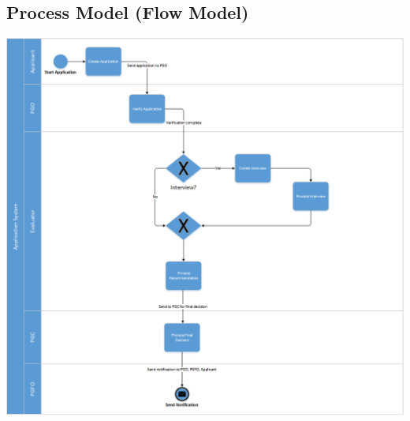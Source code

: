 \documentclass{article}
\begin{document}
\subsection{Process Model (Flow Model)}
\includegraphics[scale=0.6]{ApplicationSystemFlow.png} \\ 
\end{document}
